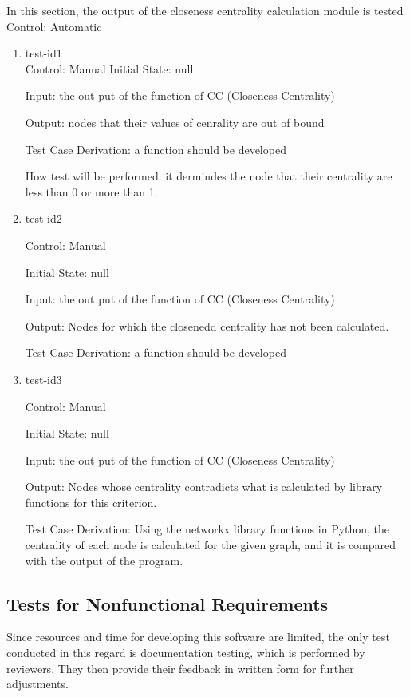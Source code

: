 \documentclass[12pt, titlepage]{article}
\begin{document}
In this section, the output of the closeness centrality calculation module is tested
Control: Automatic

\begin{enumerate}

\item{test-id1\\}	
Control: Manual				
Initial State: null
					
Input: the out put of the function of CC (Closeness Centrality)
					
Output: nodes that their values of cenrality are out of bound

Test Case Derivation: a function should be developed 

How test will be performed: it dermindes the node that their centrality are less than 0 or more than 1.
\item{test-id2\\}

Control: Manual
					
Initial State: null
					
Input: the out put of the function of CC (Closeness Centrality)
					
Output: Nodes for which the closenedd centrality has not been calculated.

Test Case Derivation: a function should be developed 

\item{test-id3\\}

Control: Manual
					
Initial State: null
					
Input: the out put of the function of CC (Closeness Centrality)
					
Output: Nodes whose centrality contradicts what is calculated by library functions for this criterion.

Test Case Derivation: Using the networkx library functions in Python, the centrality of each node is calculated for the given graph, and it is compared with the output of the program.


\end{enumerate}

\subsection{Tests for Nonfunctional Requirements}
Since resources and time for developing this software are limited, the only test conducted in this regard is documentation testing, which is performed by reviewers. They then provide their feedback in written form for further adjustments.
\end{document}
